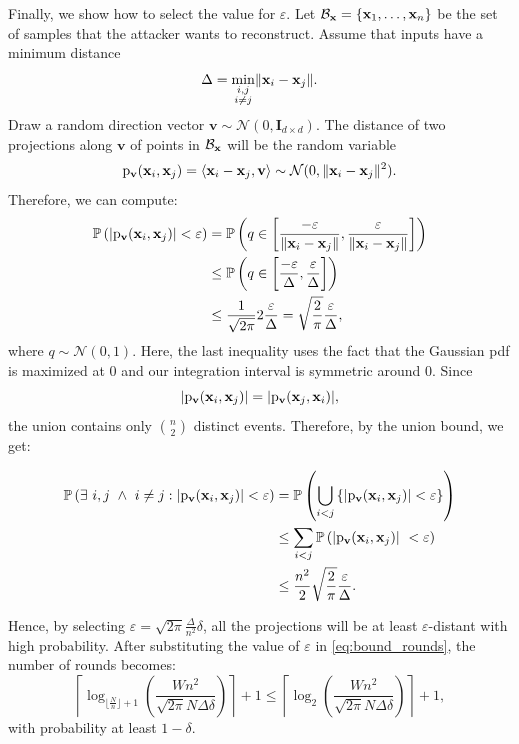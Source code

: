 Finally, we show how to select the value for $\varepsilon$. Let $\mathcal{B}_{{\mathbf{x}}}=\{{\mathbf{x}}_1,\dots,{\mathbf{x}}_n\}$ be the set of samples that the attacker wants to reconstruct. Assume that inputs have a minimum distance 
\begin{equation}
    \Delta=\min_{\substack{i,j \\ i \neq j}}\lVert {\mathbf{x}}_i - {\mathbf{x}}_j \rVert.
\end{equation}
Draw a random direction vector $\mathbf{v} \sim \mathcal{N}(0, \mathbf{I}_{d\times d})$. The distance of two projections along $\mathbf{v}$ of points in $\mathcal{B}_{{\mathbf{x}}}$ will be the random variable
\begin{equation}
   \mathrm{p}_{\mathbf{v}}({\mathbf{x}}_i, {\mathbf{x}}_j)= \langle {\mathbf{x}}_i-{\mathbf{x}}_j, \mathbf{v}\rangle \sim \mathcal{N}(0, \lVert {\mathbf{x}}_i - {\mathbf{x}}_j \rVert^2).
\end{equation}
Therefore, we can compute:
\begin{align}
    \mathbb{P}\left(\lvert \mathrm{p}_{\mathbf{v}}({\mathbf{x}}_i, {\mathbf{x}}_j) \rvert < \varepsilon\right)&= \mathbb{P}\left(q\in \left[\frac{-\varepsilon}{\lVert {\mathbf{x}}_i - {\mathbf{x}}_j \rVert}, \frac{\varepsilon}{\lVert {\mathbf{x}}_i - {\mathbf{x}}_j \rVert}\right]\right) \\&\leq \mathbb{P}\left(q \in \left[\frac{-\varepsilon}{\Delta}, \frac{\varepsilon}{\Delta}\right]\right) \\
    &\leq \frac{1}{\sqrt{2\pi}}2\frac{\varepsilon}{\Delta} = \sqrt{\frac{2}{\pi}}\frac{\varepsilon}{\Delta}, 
\end{align}
where $q \sim \mathcal{N}\left(0, 1\right)$. Here, the last inequality uses the fact that the Gaussian pdf is maximized at 0 and our integration interval is symmetric around 0. 
Since
\[
|\mathrm{p}_{\mathbf{v}}({\mathbf{x}}_i,{\mathbf{x}}_j)|
=
|\mathrm{p}_{\mathbf{v}}({\mathbf{x}}_j,{\mathbf{x}}_i)|,
\]
the union contains only $\binom{n}{2}$ distinct events. Therefore, by the union bound, we get:

\begin{align}
    \mathbb{P}\left(\exists \ i,j \ \land \ i \neq j:  \lvert \mathrm{p}_{\mathbf{v}}({\mathbf{x}}_i, {\mathbf{x}}_j) \rvert < \varepsilon\right) &= \mathbb{P}\left( \underset{i<j}{\bigcup}\left\{\lvert \mathrm{p}_{\mathbf{v}}({\mathbf{x}}_i, {\mathbf{x}}_j) \rvert < \varepsilon\right\} \right ) \\
    &\leq \sum_{i<j} \mathbb{P}\left(\lvert \mathrm{p}_{\mathbf{v}}({\mathbf{x}}_i, {\mathbf{x}}_j) \rvert\ < \varepsilon  \right) \\
    &\leq \frac{n^2}{2}\sqrt{\frac{2}{\pi}}\frac{\varepsilon}{\Delta}.
\end{align}

Hence, by selecting $\varepsilon=\sqrt{2\pi}\frac{\Delta}{n^2}\delta$, all the projections will be at least $\varepsilon$-distant with high probability. After substituting the value of $\varepsilon$ in \eqref{eq:bound_rounds}, the number of rounds becomes:
\begin{equation}\label{eq:final_rounds_bound}
\left\lceil \log_{\lfloor \frac{N}{n} \rfloor + 1} \left( \frac{Wn^2}{\sqrt{2\pi}N\Delta \delta} \right) \right\rceil + 1 \leq \left\lceil\log_2 \left( \frac{Wn^2}{\sqrt{2\pi}N\Delta \delta} \right) \right\rceil + 1,
\end{equation}
with probability at least $1-\delta$.

